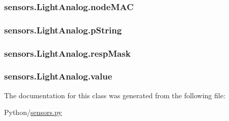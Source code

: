 \subsubsection[{\texorpdfstring{node\+M\+AC}{nodeMAC}}]{\setlength{\rightskip}{0pt plus 5cm}sensors.\+Light\+Analog.\+node\+M\+AC}\hypertarget{classsensors_1_1LightAnalog_a010099d4873d2f96962dcdf6719364eb}{}\label{classsensors_1_1LightAnalog_a010099d4873d2f96962dcdf6719364eb}
\subsubsection[{\texorpdfstring{p\+String}{pString}}]{\setlength{\rightskip}{0pt plus 5cm}sensors.\+Light\+Analog.\+p\+String}\hypertarget{classsensors_1_1LightAnalog_ab478dfaacbcb2388fa2ed06394c2cb81}{}\label{classsensors_1_1LightAnalog_ab478dfaacbcb2388fa2ed06394c2cb81}
\subsubsection[{\texorpdfstring{resp\+Mask}{respMask}}]{\setlength{\rightskip}{0pt plus 5cm}sensors.\+Light\+Analog.\+resp\+Mask}\hypertarget{classsensors_1_1LightAnalog_a6c8c998239ae4b79136e58252c631717}{}\label{classsensors_1_1LightAnalog_a6c8c998239ae4b79136e58252c631717}
\subsubsection[{\texorpdfstring{value}{value}}]{\setlength{\rightskip}{0pt plus 5cm}sensors.\+Light\+Analog.\+value}\hypertarget{classsensors_1_1LightAnalog_ab1748d35da94bc8da0afead5bded8986}{}\label{classsensors_1_1LightAnalog_ab1748d35da94bc8da0afead5bded8986}


The documentation for this class was generated from the following file\+:\begin{DoxyCompactItemize}
\item 
Python/\hyperlink{sensors_8py}{sensors.\+py}\end{DoxyCompactItemize}
